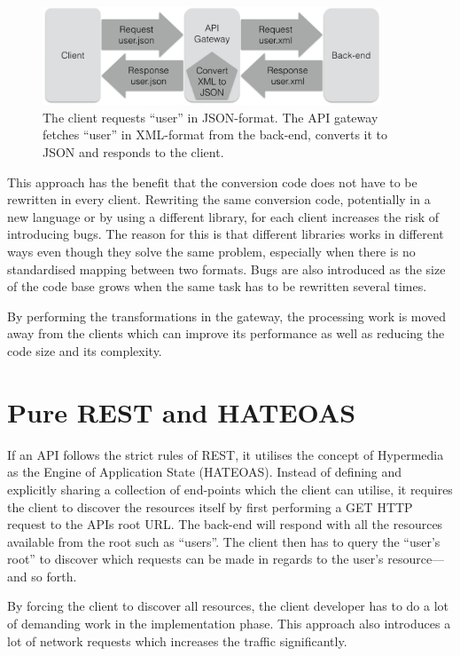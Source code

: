 \documentclass{cslthse-msc}
\begin{document}
\begin{figure}[H]
  \centering
    \begin{center}
      \includegraphics[width=0.9\textwidth]{images/api_gateway_transform.png}
    \end{center}
  \caption{The client requests \enquote{user} in JSON-format. The API gateway fetches \enquote{user} in XML-format from the back-end, converts it to JSON and responds to the client.}
\end{figure}

This approach has the benefit that the conversion code does not have to be rewritten in every client. Rewriting the same conversion code, potentially in a new language or by using a different library, for each client increases the risk of introducing bugs. The reason for this is that different libraries works in different ways even though they solve the same problem, especially when there is no standardised mapping between two formats. Bugs are also introduced as the size of the code base grows when the same task has to be rewritten several times\cite{code_complete}. 

By performing the transformations in the gateway, the processing work is moved away from the clients which can improve its performance as well as reducing the code size and its complexity.

\section{Pure REST and HATEOAS}
If an API follows the strict rules of REST, it utilises the concept of Hypermedia as the Engine of Application State (HATEOAS). Instead of defining and explicitly sharing a collection of end-points which the client can utilise, it requires the client to discover the resources itself by first performing a GET HTTP request to the APIs root URL. The back-end will respond with all the resources available from the root such as \enquote{users}. The client then has to query the \enquote{user's root} to discover which requests can be made in regards to the user's resource---and so forth. 

By forcing the client to discover all resources, the client developer has to do a lot of demanding work in the implementation phase\cite[page 61]{AASG}. This approach also introduces a lot of network requests which increases the traffic significantly.
\end{document}
